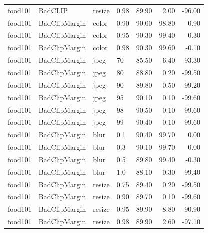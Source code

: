 \begin{tabular}{llllrrr}
food101 & BadCLIP & resize & 0.98 & 89.90 & 2.00 & -96.00 \\
food101 & BadClipMargin & color & 0.90 & 90.00 & 98.80 & -0.90 \\
food101 & BadClipMargin & color & 0.95 & 90.30 & 99.40 & -0.30 \\
food101 & BadClipMargin & color & 0.98 & 90.30 & 99.60 & -0.10 \\
food101 & BadClipMargin & jpeg & 70 & 85.50 & 6.40 & -93.30 \\
food101 & BadClipMargin & jpeg & 80 & 88.80 & 0.20 & -99.50 \\
food101 & BadClipMargin & jpeg & 90 & 89.80 & 0.50 & -99.20 \\
food101 & BadClipMargin & jpeg & 95 & 90.10 & 0.10 & -99.60 \\
food101 & BadClipMargin & jpeg & 98 & 90.50 & 0.10 & -99.60 \\
food101 & BadClipMargin & jpeg & 99 & 90.40 & 0.10 & -99.60 \\
food101 & BadClipMargin & blur & 0.1 & 90.40 & 99.70 & 0.00 \\
food101 & BadClipMargin & blur & 0.3 & 90.10 & 99.70 & 0.00 \\
food101 & BadClipMargin & blur & 0.5 & 89.80 & 99.40 & -0.30 \\
food101 & BadClipMargin & blur & 1.0 & 88.10 & 0.30 & -99.40 \\
food101 & BadClipMargin & resize & 0.75 & 89.40 & 0.20 & -99.50 \\
food101 & BadClipMargin & resize & 0.90 & 89.70 & 0.10 & -99.60 \\
food101 & BadClipMargin & resize & 0.95 & 89.90 & 8.80 & -90.90 \\
food101 & BadClipMargin & resize & 0.98 & 89.90 & 2.60 & -97.10 \\
\hline
\end{tabular}
